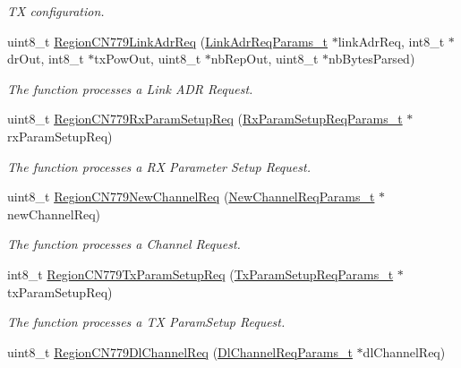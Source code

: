 \begin{DoxyCompactItemize}
\begin{DoxyCompactList}\small\item\em TX configuration. \end{DoxyCompactList}\item 
uint8\+\_\+t \mbox{\hyperlink{group___r_e_g_i_o_n_c_n779_gae3bdb6e223de1fd6b72182eb278f3828}{Region\+C\+N779\+Link\+Adr\+Req}} (\mbox{\hyperlink{group___r_e_g_i_o_n_gad4af503e8d4de1846129e26a799a1e8e}{Link\+Adr\+Req\+Params\+\_\+t}} $\ast$link\+Adr\+Req, int8\+\_\+t $\ast$dr\+Out, int8\+\_\+t $\ast$tx\+Pow\+Out, uint8\+\_\+t $\ast$nb\+Rep\+Out, uint8\+\_\+t $\ast$nb\+Bytes\+Parsed)
\begin{DoxyCompactList}\small\item\em The function processes a Link A\+DR Request. \end{DoxyCompactList}\item 
uint8\+\_\+t \mbox{\hyperlink{group___r_e_g_i_o_n_c_n779_gad14dfe4070bdf46142d09d35d617b25c}{Region\+C\+N779\+Rx\+Param\+Setup\+Req}} (\mbox{\hyperlink{group___r_e_g_i_o_n_ga7165f282c670c728c36d534df2285157}{Rx\+Param\+Setup\+Req\+Params\+\_\+t}} $\ast$rx\+Param\+Setup\+Req)
\begin{DoxyCompactList}\small\item\em The function processes a RX Parameter Setup Request. \end{DoxyCompactList}\item 
uint8\+\_\+t \mbox{\hyperlink{group___r_e_g_i_o_n_c_n779_gab4c6ffa72f1da0e2ef40431ab7fd72fa}{Region\+C\+N779\+New\+Channel\+Req}} (\mbox{\hyperlink{group___r_e_g_i_o_n_gae2abcdb6dbb843c9faf5fd3009eca9d6}{New\+Channel\+Req\+Params\+\_\+t}} $\ast$new\+Channel\+Req)
\begin{DoxyCompactList}\small\item\em The function processes a Channel Request. \end{DoxyCompactList}\item 
int8\+\_\+t \mbox{\hyperlink{group___r_e_g_i_o_n_c_n779_ga6dc963da2e0b143e7313780fcd946855}{Region\+C\+N779\+Tx\+Param\+Setup\+Req}} (\mbox{\hyperlink{group___r_e_g_i_o_n_ga26836ef2996e70410e42ef471073f855}{Tx\+Param\+Setup\+Req\+Params\+\_\+t}} $\ast$tx\+Param\+Setup\+Req)
\begin{DoxyCompactList}\small\item\em The function processes a TX Param\+Setup Request. \end{DoxyCompactList}\item 
uint8\+\_\+t \mbox{\hyperlink{group___r_e_g_i_o_n_c_n779_gaa34ccc032a50e5bef17fc59ca5eb89bc}{Region\+C\+N779\+Dl\+Channel\+Req}} (\mbox{\hyperlink{group___r_e_g_i_o_n_gae0d608ff1f8ea0a430e4f9a4c38ec7f3}{Dl\+Channel\+Req\+Params\+\_\+t}} $\ast$dl\+Channel\+Req)

\end{DoxyCompactItemize}
